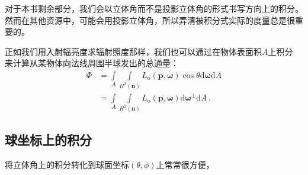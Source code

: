 对于本书剩余部分，我们会以立体角而不是投影立体角的形式书写方向上的积分。
然而在其他资源中，可能会用投影立体角，所以弄清被积分式实际的度量总是很重要的。

正如我们用入射辐亮度求辐射照度那样，我们也可以通过在物体表面积$A$上积分
来计算从某物体向法线周围半球发出的总通量：
\begin{align*}
    \varPhi & =\int\limits_A{\int\limits_{H^2({\bm n})}L_{\mathrm{o}}({\bm p},{\bm\omega})\cos\theta\mathrm{d}{\bm\omega}\mathrm{d}A}   \\
            & =\int\limits_A{\int\limits_{H^2({\bm n})}L_{\mathrm{o}}({\bm p},{\bm\omega})\mathrm{d}{\bm\omega}^{\perp}\mathrm{d}A}\, .
\end{align*}

\subsection{球坐标上的积分}
将立体角上的积分转化到球面坐标$(\theta,\phi)$上常常很方便，
